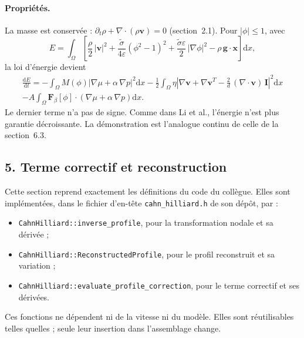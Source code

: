 \paragraph{Propriétés.} La masse est conservée : $\partial_t\rho + \nabla\cdot(\rho\mathbf{v}) = 0$ (section~2.1). Pour $|\phi|\le1$, avec
\begin{equation}
  E = \int_\Omega\left[\frac{\rho}{2}\,|\mathbf{v}|^{2}
  + \frac{\tilde{\sigma}}{4\varepsilon}\left(\phi^{2}-1\right)^{2}
  + \frac{\tilde{\sigma}\varepsilon}{2}\,|\nabla\phi|^{2}
  - \rho\,\mathbf{g}\cdot\mathbf{x}\right]\mathrm{d}x,
\end{equation}
la loi d'énergie devient
\begin{multline}\label{cp:energie-continue}
  \frac{\mathrm{d}E}{\mathrm{d}t}
  = - \int_\Omega M(\phi)\left|\nabla\mu + \alpha\,\nabla p\right|^{2}\mathrm{d}x
  - \frac{1}{2}\int_\Omega \eta\left|\nabla\mathbf{v} + \nabla\mathbf{v}^{T}
    - \frac{2}{d}\,(\nabla\cdot\mathbf{v})\,\mathbf{I}\right|^{2}\mathrm{d}x\\
  - A\int_\Omega \mathbf{F}_\beta[\phi]\cdot\left(\nabla\mu + \alpha\,\nabla p\right)\mathrm{d}x .
\end{multline}
Le dernier terme n'a pas de signe. Comme dans Li et al., l'énergie n'est plus garantie décroissante. La démonstration est l'analogue continu de celle de la section~6.3.

\subsection*{5. Terme correctif et reconstruction}

Cette section reprend exactement les définitions du code du collègue. Elles sont implémentées, dans le fichier d'en-tête \texttt{cahn\_hilliard.h} de son dépôt, par :
\begin{itemize}
  \item \texttt{CahnHilliard::inverse\_profile}, pour la transformation nodale et sa dérivée ;
  \item \texttt{CahnHilliard::ReconstructedProfile}, pour le profil reconstruit et sa variation ;
  \item \texttt{CahnHilliard::evaluate\_profile\_correction}, pour le terme correctif et ses dérivées.
\end{itemize}
Ces fonctions ne dépendent ni de la vitesse ni du modèle. Elles sont réutilisables telles quelles ; seule leur insertion dans l'assemblage change.

